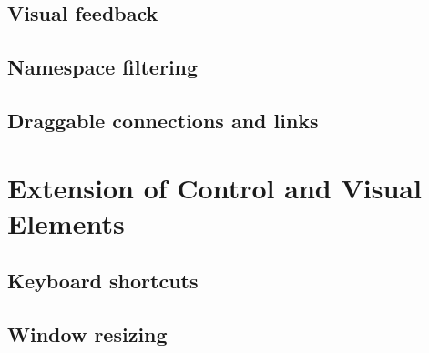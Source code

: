 
	\subsection{Visual feedback} %
	\label{sub:visual_feedback}


	\subsection{Namespace filtering} %
	\label{sub:namespace_filtering}

	\subsection{Draggable connections and links} %
	\label{sub:draggable_connections_and_links}
	


\section{Extension of Control and Visual Elements} %
\label{sec:extension_of_control_and_visual_elements}

	\subsection{Keyboard shortcuts} %
	\label{sec:keyboard_shortcuts}

	

	\subsection{Window resizing} %
	\label{sec:window_resizing}
	

